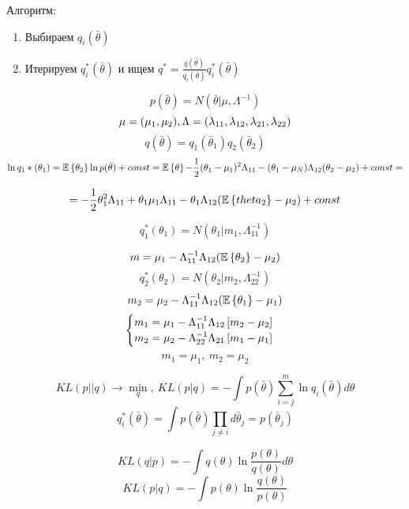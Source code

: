 Алгоритм:
\begin{enumerate}
	\item Выбираем $q_i(\bar{\theta})$
	\item Итерируем $q_i^*(\bar{\theta})$ и ищем $q^* = \frac{q(\bar{\theta})}{q_i(\bar{\theta})}q_i^*(\bar{\theta})$
\end{enumerate}

\begin{example}
	$$p(\bar{\theta}) = N(\bar{\theta}| \mu, \Lambda^{-1})$$
	$$ \mu = (\mu_1, \mu_2), \Lambda = ( \lambda_{11}, \lambda_{12}, \\ \lambda_{21}, \lambda_{22}) $$
	$$ q(\bar{\theta}) = q_1(\bar{\theta}_1)q_2(\bar{\theta}_2) $$
	$$ \ln q_1*(\theta_1) = \mathbb{E}\left\{ \theta_2 \right\} \ln p(\bar{\theta}) + const  = \mathbb{E}\left\{ \theta \right\}{-\frac{1}{2}(\theta_1 - \mu_1)^2 \Lambda_{11} - (\theta_1-\mu_N)\Lambda_{12}(\theta_2-\mu_2)} + const =$$  

	$$= -\frac{1}{2} \theta_1^2 \Lambda_{11} + \theta_1 \mu_1 \Lambda_{11} - \theta_1 \Lambda_{12}(\mathbb{E}\left\{ theta_2 \right\}-\mu_2) + const $$

	$$ q_1^*(\theta_1) = N(\theta_1|m_1, \Lambda_{11}^{-1}) $$

	$$ m = \mu_1 - \Lambda_{11}^{-1}\Lambda_{12}(\mathbb{E}\left\{ \theta_2 \right\} - \mu_2) $$
	$$ q_2^*(\theta_2) = N(\theta_2|m_2, \Lambda_{22}^{-1}) $$
	$$ m_2 = \mu_2 - \Lambda_{11}^{-1}\Lambda_{12}(\mathbb{E}\left\{ \theta_1 \right\} - \mu_1) $$
	$$ \begin{cases}
		m_1 = \mu_1 - \Lambda_{11}^{-1}\Lambda_{12}\left[ m_2-\mu_2 \right] & \\
		m_2 = \mu_2 - \Lambda_{22}^{-1}\Lambda_{21}\left[ m_1-\mu_1 \right] \\
	\end{cases} $$
	$$ m_1 = \mu_1, \ m_2 = \mu_2 $$

	$$ KL(p||q) \to \min_q, \ KL(p|q) = -\int p(\bar{\theta}) \sum_{i=j}^m \ln q_i(\bar{\theta}) d\theta$$
	$$ q_i^*(\bar{\theta}) = \int p(\bar{\theta}) \prod_{j \neq i} d\bar{\theta}_j = p(\bar{\theta}_j) $$

	$$ KL(q|p) = -\int q(\theta) \ln \frac{p(\theta)}{q(\theta)} d\theta $$
	$$ KL(p|q) = - \int p(\theta) \ln \frac{q(\theta)}{p(\theta)} $$

\end{example}

